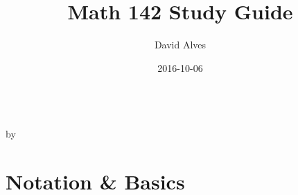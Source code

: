 \documentclass[12pt]{article}
\begin{document}

\title{Math 142 Study Guide}
\date{2016-10-06}
\author{David Alves}

\begin{center}
\large \thetitle \\
by \theauthor \\
\end{center}
\tableofcontents

\section{Notation \& Basics}
\newcommand{\termtable}[1]{
    \def\arraystretch{1.75}
    \begin{tabular}{ r p{28em} }
    #1
    \end{tabular}
}
\newcommand{\term}[1]{\textbf{#1}&}
\end{document}
